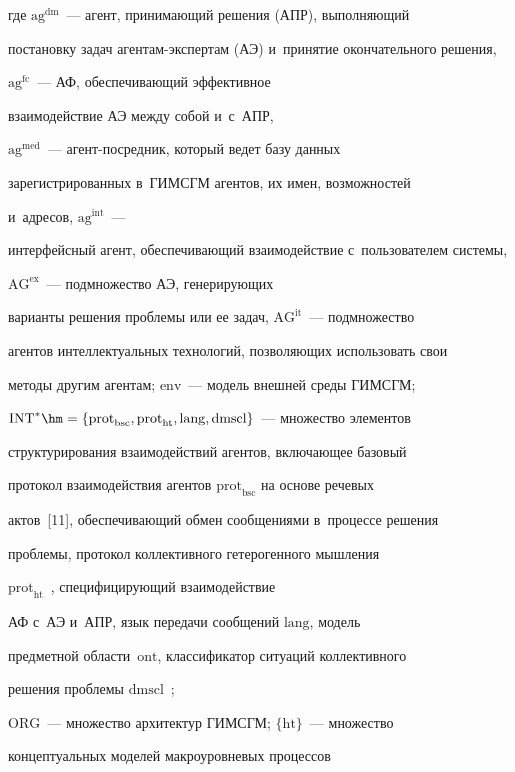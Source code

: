 где $\mathrm{ag}^{\mathrm{dm}}$~--- агент, принимающий решения (АПР), выполняющий 


постановку задач аген\-там-экс\-пер\-там (АЭ) и~принятие окончательного решения, 


$\mathrm{ag}^{\mathrm{fc}}$~--- АФ, обеспечивающий эффективное 


взаимодействие АЭ между собой и~с~АПР, 


$\mathrm{ag}^{\mathrm{med}}$~--- агент-по\-сред\-ник, который ведет базу данных 


зарегистрированных в~\mbox{ГИМСГМ} агентов, их имен, возможностей 


и~адресов, $\mathrm{ag}^{\mathrm{int}}$~---  


интерфейсный агент, обеспечивающий взаимодействие с~пользователем системы, 


$\mathrm{AG}^{\mathrm{ex}}$~--- подмножество АЭ, генерирующих 


варианты решения проблемы или ее задач, $\mathrm{AG}^{\mathrm{it}}$~--- подмножество 


агентов интеллектуальных технологий, позволяющих использовать свои 


методы другим агентам; $\mathrm{env}$~--- модель внешней среды \mbox{ГИМСГМ}; 


$\mathrm{INT}^*\hm= \{ \mathrm{prot}_{\mathrm{bsc}}, 


\mathrm{prot}_{\mathrm{ht}}, \mathrm{lang}, \mathrm{dmscl}\}$~--- множество элементов 


структурирования взаимодействий агентов, включающее базовый 


протокол взаимодействия агентов $\mathrm{prot}_{\mathrm{bsc}}$ на основе речевых 


актов~[11], обеспечивающий обмен сообщениями в~процессе решения 


проблемы, протокол коллективного гетерогенного мышления 


$\mathrm{prot}_{\mathrm{ht}}$~\cite{12-lis}, специфицирующий взаимодействие  


АФ с~АЭ и~АПР, язык передачи сообщений $\mathrm{lang}$, модель 


предметной об\-ласти~$\mathrm{ont}$, классификатор ситуаций коллективного 


решения проблемы $\mathrm{dmscl}$~\cite{7-lis};  


$\mathrm{ORG}$~--- множество архитектур \mbox{ГИМСГМ}; $\{ \mathrm{ht}\}$~--- множество 


концептуальных моделей макроуровневых процессов 


